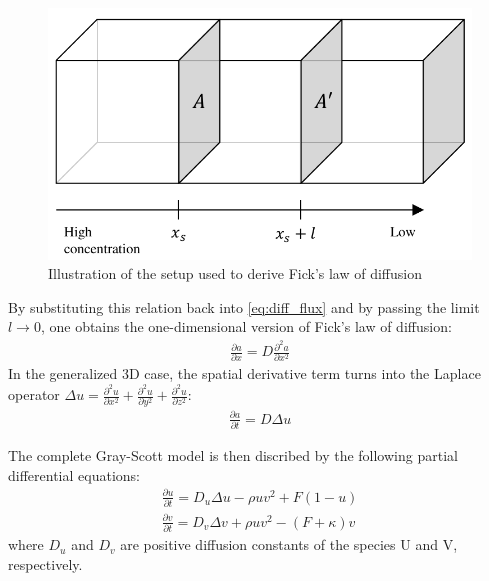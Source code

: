 \begin{figure}
\centering
\includegraphics[width=\textwidth]{images/fickslaw.pdf}
\caption{Illustration of the setup used to derive Fick's law of diffusion}
\label{fig:fickslaw}
\end{figure}

By substituting this relation back into \eqref{eq:diff_flux} and by passing the limit $l \to 0$, one obtains the one-dimensional version of Fick's law of diffusion:
\begin{align}
\frac{\partial a}{\partial x} = D \frac{\partial^2 a}{\partial x^2}
\end{align}
In the generalized 3D case, the spatial derivative term turns into the Laplace operator $\Delta u = \frac{\partial^2 u}{\partial x^2} + \frac{\partial^2 u}{\partial y^2} + \frac{\partial^2 u}{\partial z^2}$: 
\begin{align}
\frac{\partial a}{\partial t} = D \Delta u
\end{align}

The complete Gray-Scott model is then discribed by the following partial differential equations:
\begin{gather}
\frac{\partial u}{\partial t} = D_u \Delta u - \rho u v^2 + F(1-u) \\
\frac{\partial v}{\partial t} = D_v \Delta v + \rho u v^2 - (F+\kappa) v
\end{gather}
where $D_u$ and $D_v$ are positive diffusion constants of the species U and V, respectively.